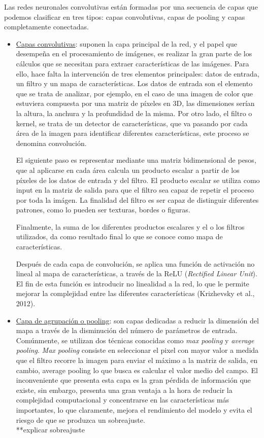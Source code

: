 Las redes neuronales convolutivas están formadas por una secuencia de capas que podemos clasificar en tres tipos: capas convolutivas, capas de pooling y capas completamente conectadas.\\ 
\begin{itemize}
	\item \underline{Capas convolutivas}: suponen la capa principal de la red, y el papel que desempeña en el procesamiento de imágenes, es realizar la gran parte de los cálculos que se necesitan para extraer características de las imágenes. Para ello, hace falta la intervención de tres elementos principales: datos de entrada, un filtro y un mapa de características. 
	Los datos de entrada son el elemento que se trata de analizar, por ejemplo, en el caso de una imagen de color que estuviera compuesta por una matriz de píxeles en 3D, las dimensiones serían la altura, la anchura y la profundidad de la misma. 
	Por otro lado, el filtro o kernel, se trata de un detector de características, que va pasando por cada área de la imagen para identificar diferentes características, este proceso se denomina convolución. 

	El siguiente paso es representar mediante una matriz bidimensional de pesos, que al aplicarse en cada área calcula un producto escalar a partir de los píxeles de los datos de entrada y del filtro. El producto escalar se utiliza como input en la matriz de salida para que el filtro sea capaz de repetir el proceso por toda la imágen. La finalidad del filtro es ser capaz de distinguir diferentes patrones, como lo pueden ser texturas, bordes o figuras. 
	
	Finalmente, la suma de los diferentes productos escalares y el o los filtros utilizados, da como resultado final lo que se conoce como mapa de características. 
	
	Después de cada capa de convolución, se aplica una función de activación no lineal al mapa de características, a través de la ReLU (\textit{Rectified Linear Unit}). El fin de esta función es introducir no linealidad a la red, lo que le permite mejorar la complejidad entre las diferentes características (Krizhevsky et al., 2012). \\
	
\item	\underline{Capa de agrupación o pooling}: son capas dedicadas a reducir la dimensión del mapa a través de la disminución del número de parámetros de entrada.
	Comúnmente, se utilizan dos técnicas conocidas como \textit{max pooling} y \textit{average pooling}. \textit{Max pooling} consiste en seleccionar el pixel con mayor valor a medida que el filtro recorre la imagen para enviar el máximo a la matriz de salida, en cambio, average pooling lo que busca es calcular el valor medio del campo. El inconveniente que presenta esta capa es la gran pérdida de información que existe, sin embargo, presenta una gran ventaja a la hora de reducir la complejidad computacional y concentrarse en las características más importantes, lo que claramente, mejora el rendimiento del modelo y evita el riesgo de que se produzca un sobreajuste.\\ **explicar sobreajuste
	

\end{itemize}
